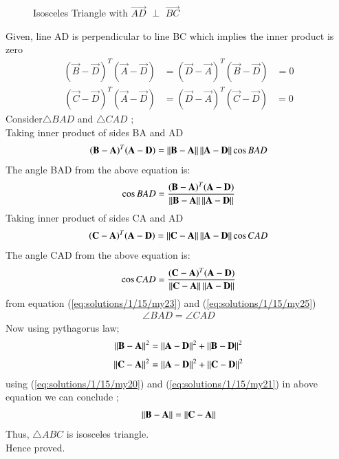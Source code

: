 
\begin{figure}[!ht]
\centering
\resizebox{\columnwidth}{!}{}
\caption{Isosceles Triangle with $\vec{AD}$  $\perp$ $\vec{BC}$}
\label{eq:solutions/1/15/fig:tri_right_angle}
\end{figure}
Given,
line AD is perpendicular to line BC which implies the inner product is zero  	
\begin{align}\label{eq:solutions/1/15/my20}	
(\vec{B}-\vec{D})^T (\vec{A}-\vec{D}) &= (\vec{D}-\vec{A
})^T (\vec{B}-\vec{D})&= 0
\end{align}
\begin{align}\label{eq:solutions/1/15/my21}
(\vec{C}-\vec{D})^T (\vec{A}-\vec{D}) &= (\vec{D}-\vec{A})^T (\vec{C}-\vec{D})&= 0	
\end{align}
Consider$\triangle{BAD}$ and $\triangle{CAD}$ ;\\	
Taking inner product of sides BA and AD	
\begin{align}\label{eq:solutions/1/15/my22}	
(\mathbf{B}-\mathbf{A})^T(\mathbf{A}-\mathbf{D}) =	
\left\lVert\mathbf{B}-\mathbf{A}\right\rVert\left\lVert\mathbf{A}-\mathbf{D}\right\rVert\cos{BAD}	
\end{align}
The angle BAD from the  above equation is:	
\begin{align}\label{eq:solutions/1/15/my23}	
     \cos{BAD} = \frac{(\mathbf{B}-\mathbf{A})^T(\mathbf{A}-\mathbf{D})}{\left\lVert\mathbf{B}-\mathbf{A}\right\rVert\left\lVert\mathbf{A}-\mathbf{D}\right\rVert} 
\end{align}
Taking inner product of sides CA and AD	
\begin{align}\label{eq:solutions/1/15/my24}	
(\mathbf{C}-\mathbf{A})^T(\mathbf{A}-\mathbf{D}) =	
\left\lVert\mathbf{C}-\mathbf{A}\right\rVert\left\lVert\mathbf{A}-\mathbf{D}\right\rVert\cos{CAD}	
\end{align}
The angle CAD from the  above equation is:	
\begin{align}\label{eq:solutions/1/15/my25}	
     \cos{CAD} = \frac{(\mathbf{C}-\mathbf{A})^T(\mathbf{A}-\mathbf{D})}{\left\lVert\mathbf{C}-\mathbf{A}\right\rVert\left\lVert\mathbf{A}-\mathbf{D}\right\rVert} 
\end{align}
from equation (\ref{eq:solutions/1/15/my23}) and (\ref{eq:solutions/1/15/my25})\\	
\begin{align}
\angle {BAD}=\angle {CAD}	
\end{align}
Now using pythagorus law;
\begin{align}\label{eq:solutions/1/15/my26}
     \left\lVert\mathbf{B-A}\right\rVert^2 = \left\lVert\mathbf{A-D}\right\rVert^2+ \left\lVert\mathbf{B-D}\right\rVert^2
\end{align}
\begin{align}\label{eq:solutions/1/15/my27}
     \left\lVert\mathbf{C-A}\right\rVert^2 = \left\lVert\mathbf{A-D}\right\rVert^2+ \left\lVert\mathbf{C-D}\right\rVert^2
\end{align}
using (\ref{eq:solutions/1/15/my20}) and (\ref{eq:solutions/1/15/my21}) in above equation we can conclude ;
\begin{align}\label{eq:solutions/1/15/my28}
     \left\lVert\mathbf{B-A}\right\rVert = \left\lVert\mathbf{C-A}\right\rVert 
\end{align}
Thus, $\triangle{ABC}$ is isosceles triangle. \\
Hence proved.
